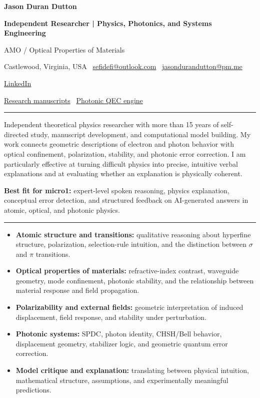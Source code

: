 \documentclass[10pt,letterpaper]{article}
\newcommand{\sectiontitle}[1]{\vspace{0.65em}{\large\bfseries\color{accent}#1}\par\vspace{0.12em}\hrule\vspace{0.35em}}
\begin{document}
\color{ink}

\begin{center}
{\fontsize{24}{28}\selectfont\bfseries Jason Duran Dutton}\par
\vspace{0.12em}
{\large\color{accent}\bfseries Independent Researcher | Physics, Photonics, and Systems Engineering}\par
{\normalsize AMO / Optical Properties of Materials}\par
\vspace{0.35em}
Castlewood, Virginia, USA \textbar\ \href{mailto:sefidefi@outlook.com}{sefidefi@outlook.com} \textbar\ \href{mailto:jasondurandutton@pm.me}{jasondurandutton@pm.me}\par
\href{https://linkedin.com/in/jasondurandutton}{LinkedIn}\par
\href{https://github.com/JasonSEFIDEFI/SEFI-Manuscripts}{Research manuscripts} \textbar\ \href{https://github.com/JasonSEFIDEFI/SEFI_QEC_Stack}{Photonic QEC engine}
\end{center}

\sectiontitle{Profile}
Independent theoretical physics researcher with more than 15 years of self-directed study, manuscript development, and computational model building. My work connects geometric descriptions of electron and photon behavior with optical confinement, polarization, stability, and photonic error correction. I am particularly effective at turning difficult physics into precise, intuitive verbal explanations and at evaluating whether an explanation is physically coherent.

\textbf{Best fit for micro1:} expert-level spoken reasoning, physics explanation, conceptual error detection, and structured feedback on AI-generated answers in atomic, optical, and photonic physics.

\sectiontitle{AMO and Optical-Physics Focus}
\begin{itemize}
    \item \textbf{Atomic structure and transitions:} qualitative reasoning about hyperfine structure, polarization, selection-rule intuition, and the distinction between $\sigma$ and $\pi$ transitions.
    \item \textbf{Optical properties of materials:} refractive-index contrast, waveguide geometry, mode confinement, photonic stability, and the relationship between material response and field propagation.
    \item \textbf{Polarizability and external fields:} geometric interpretation of induced displacement, field response, and stability under perturbation.
    \item \textbf{Photonic systems:} SPDC, photon identity, CHSH/Bell behavior, displacement geometry, stabilizer logic, and geometric quantum error correction.
    \item \textbf{Model critique and explanation:} translating between physical intuition, mathematical structure, assumptions, and experimentally meaningful predictions.
\end{itemize}
\end{document}
